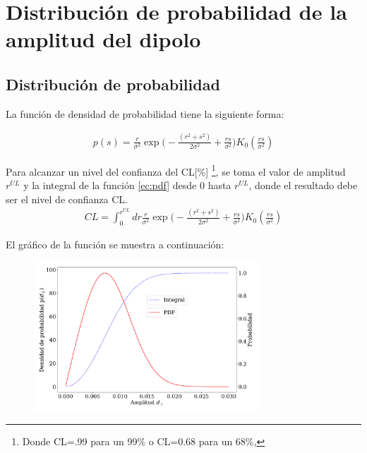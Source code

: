 \chapter{Distribución de probabilidad de la amplitud del dipolo}

\section{Distribución de probabilidad}

La función de densidad de probabilidad tiene la siguiente forma:

\begin{align}
    p(s) =\frac{r}{\sigma^2}\exp{\Big( -\frac{(r^2+s^2)}{2\sigma^2} + \frac{rs}{\sigma^2}\Big)}K_0(\frac{rs}{\sigma^2})    \label{ec:pdf}
\end{align}    

Para alcanzar un  nivel del confianza  del  CL[\%] \footnote{ Donde CL=.99 para un 99\% o CL=0.68 para un 68\%,},  se toma el valor de amplitud $r^{UL}$ y la integral de la función \ref{ec:pdf} desde 0 hasta $r^{UL}$, donde el resultado debe ser el nivel de confianza CL.
\begin{align}
    CL = \int_{0}^{r^{UL}} dr \frac{r}{\sigma^2}\exp{\Big( -\frac{(r^2+s^2)}{2\sigma^2} + \frac{rs}{\sigma^2}\Big)}K_0(\frac{rs}{\sigma^2})
    \label{ec:integral}
\end{align}

El gráfico de la función se muestra a continuación:

\begin{figure}[H]
    \begin{small}
        \begin{center}
            \includegraphics[width=0.75\textwidth]{bessel_prob.pdf}
        \end{center}
        \caption{}
    \end{small}
\end{figure}


